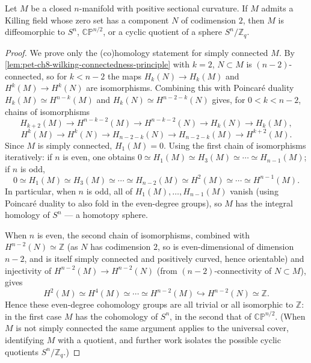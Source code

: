\begin{lemma}
  \label{lem:pet-ch8-grove-searle-codim2}
  Let $M$ be a closed $n$-manifold with positive sectional curvature. If $M$
  admits a Killing field whose zero set has a component $N$ of codimension
  $2$, then $M$ is diffeomorphic to $S^n$, $\mathbb{CP}^{n/2}$, or a cyclic
  quotient of a sphere $S^n/\mathbb{Z}_q$.
\end{lemma}
\begin{proof}
  We prove only the (co)homology statement for simply connected $M$. By
  \cref{lem:pet-ch8-wilking-connectedness-principle} with $k=2$, $N\subset M$ is
  $(n-2)$-connected, so for $k<n-2$ the maps $H_k(N)\to H_k(M)$ and
  $H^k(M)\to H^k(N)$ are isomorphisms. Combining this with Poincar\'e duality
  $H_k(M)\simeq H^{n-k}(M)$ and $H_k(N)\simeq H^{n-2-k}(N)$ gives, for
  $0<k<n-2$, chains of isomorphisms
  \[
    H_{k+2}(M)\to H^{n-k-2}(M)\to H^{n-k-2}(N)\to H_k(N)\to H_k(M),
  \]
  \[
    H^k(M)\to H^k(N)\to H_{n-2-k}(N)\to H_{n-2-k}(M)\to H^{k+2}(M).
  \]
  Since $M$ is simply connected, $H_1(M)=0$. Using the first chain of
  isomorphisms iteratively: if $n$ is even, one obtains
  $0\simeq H_1(M)\simeq H_3(M)\simeq\cdots\simeq H_{n-1}(M)$; if $n$ is odd,
  \[
    0\simeq H_1(M)\simeq H_3(M)\simeq\cdots\simeq H_{n-2}(M)\simeq H^2(M)\simeq\cdots\simeq H^{n-1}(M).
  \]
  In particular, when $n$ is odd, all of $H_1(M),\dots,H_{n-1}(M)$ vanish (using
  Poincar\'e duality to also fold in the even-degree groups), so $M$ has the
  integral homology of $S^n$ — a homotopy sphere.

  When $n$ is even, the second chain of isomorphisms, combined with
  $H^{n-2}(N)\simeq\mathbb{Z}$ (as $N$ has codimension $2$, so is
  even-dimensional of dimension $n-2$, and is itself simply connected and
  positively curved, hence orientable) and injectivity of
  $H^{n-2}(M)\to H^{n-2}(N)$ (from $(n-2)$-connectivity of $N\subset M$), gives
  \[
    H^2(M)\simeq H^4(M)\simeq\cdots\simeq H^{n-2}(M)\hookrightarrow H^{n-2}(N)\simeq\mathbb{Z}.
  \]
  Hence these even-degree cohomology groups are all trivial or all isomorphic
  to $\mathbb{Z}$: in the first case $M$ has the cohomology of $S^n$, in the
  second that of $\mathbb{CP}^{n/2}$. (When $M$ is not simply connected the
  same argument applies to the universal cover, identifying $M$ with a
  quotient, and further work isolates the possible cyclic quotients
  $S^n/\mathbb{Z}_q$.)
\end{proof}

